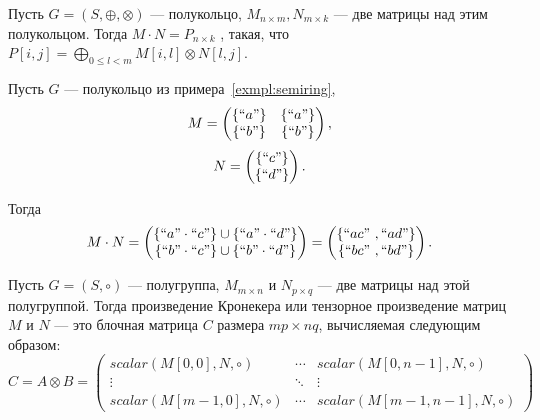 \begin{definition}\label{def:MxM}

	Пусть $G = (S,\oplus, \otimes)$ --- полукольцо, $M_{n \times m}, N_{m\times k}$ --- две матрицы над этим полукольцом.
	Тогда
	$
		M\cdot N = P_{n \times k}
	$
	, такая, что $P[i,j] = \bigoplus_{0 \leq l < m} M[i,l] \otimes N[l,j]$.

\end{definition}

\begin{example}
	Пусть $G$ --- полукольцо из примера~\ref{exmpl:semiring},
	$$ M =
		\begin{pmatrix}
			\{``a"\} & \{``a"\} \\
			\{``b"\} & \{``b"\} \\
		\end{pmatrix},
	$$
	$$ N =
		\begin{pmatrix}
			\{``c"\} \\
			\{``d"\} \\
		\end{pmatrix}.
	$$

	Тогда
	$$
		M \cdot N =
		\begin{pmatrix}
			\{``a" \cdot ``c"\} \cup \{``a" \cdot ``d"\} \\
			\{``b" \cdot ``c"\} \cup \{``b" \cdot ``d"\}
		\end{pmatrix}=
		\begin{pmatrix}
			\{``ac" \ ,  ``ad"\} \\
			\{``bc" \ , ``bd"\}
		\end{pmatrix}.
	$$

\end{example}


\begin{definition}
	Пусть $G = (S,\circ)$ --- полугруппа, $M_{m\times n}$ и $N_{p\times q}$ --- две матрицы над этой полугруппой.
	Тогда произведение Кронекера или тензорное произведение матриц $M$ и $N$ --- это блочная матрица $C$ размера $mp \times nq$, вычисляемая следующим образом:
	$$
		C = A \otimes B =
		\begin{pmatrix}
			scalar(M[0,0],N,\circ)   & \cdots & scalar(M[0,n-1],N,\circ)   \\
			\vdots                   & \ddots & \vdots                     \\
			scalar(M[m-1,0],N,\circ) & \cdots & scalar(M[m-1,n-1],N,\circ)
		\end{pmatrix}
	$$

\end{definition}

